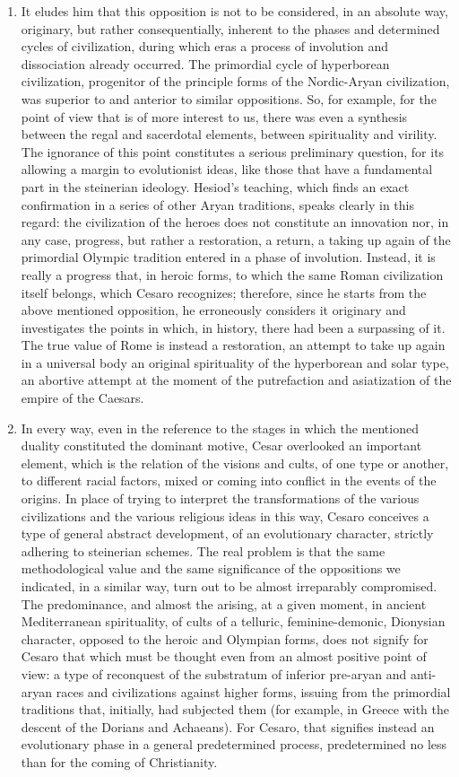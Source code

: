 \begin{enumerate}
\item It eludes him that this opposition is not to be considered, in an absolute way, originary, but rather consequentially, inherent to the phases and determined cycles of civilization, during which eras a process of involution and dissociation already occurred. The primordial cycle of hyperborean civilization, progenitor of the principle forms of the Nordic-Aryan civilization, was superior to and anterior to similar oppositions. So, for example, for the point of view that is of more interest to us, there was even a synthesis between the regal and sacerdotal elements, between spirituality and virility. The ignorance of this point constitutes a serious preliminary question, for its allowing a margin to evolutionist ideas, like those that have a fundamental part in the steinerian ideology. Hesiod's teaching, which finds an exact confirmation in a series of other Aryan traditions, speaks clearly in this regard: the civilization of the heroes does not constitute an innovation nor, in any case, progress, but rather a restoration, a return, a taking up again of the primordial Olympic tradition entered in a phase of involution. Instead, it is really a progress that, in heroic forms, to which the same Roman civilization itself belongs, which Cesaro recognizes; therefore, since he starts from the above mentioned opposition, he erroneously considers it originary and investigates the points in which, in history, there had been a surpassing of it. The true value of Rome is instead a restoration, an attempt to take up again in a universal body an original spirituality of the hyperborean and solar type, an abortive attempt at the moment of the putrefaction and asiatization of the empire of the Caesars. 
\item In every way, even in the reference to the stages in which the mentioned duality constituted the dominant motive, Cesar overlooked an important element, which is the relation of the visions and cults, of one type or another, to different racial factors, mixed or coming into conflict in the events of the origins. In place of trying to interpret the transformations of the various civilizations and the various religious ideas in this way, Cesaro conceives a type of general abstract development, of an evolutionary character, strictly adhering to steinerian schemes. The real problem is that the same methodological value and the same significance of the oppositions we indicated, in a similar way, turn out to be almost irreparably compromised. The predominance, and almost the arising, at a given moment, in ancient Mediterranean spirituality, of cults of a telluric, feminine-demonic, Dionysian character, opposed to the heroic and Olympian forms, does not signify for Cesaro that which must be thought even from an almost positive point of view: a type of reconquest of the substratum of inferior pre-aryan and anti-aryan races and civilizations against higher forms, issuing from the primordial traditions that, initially, had subjected them (for example, in Greece with the descent of the Dorians and Achaeans). For Cesaro, that signifies instead an evolutionary phase in a general predetermined process, predetermined no less than for the coming of Christianity. 
\end{enumerate}

